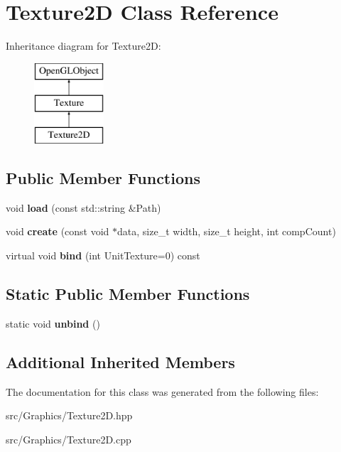\hypertarget{class_texture2_d}{\section{Texture2\+D Class Reference}
\label{class_texture2_d}
}
Inheritance diagram for Texture2\+D\+:\begin{figure}[H]
\begin{center}
\leavevmode
\includegraphics[height=3.000000cm]{class_texture2_d}
\end{center}
\end{figure}
\subsection*{Public Member Functions}
\begin{DoxyCompactItemize}
\item 
\hypertarget{class_texture2_d_a2f34b32ade581a7c2c51d33f073b7d6e}{void {\bfseries load} (const std\+::string \&Path)}\label{class_texture2_d_a2f34b32ade581a7c2c51d33f073b7d6e}

\item 
\hypertarget{class_texture2_d_abb1f4151f215b0c6b320d4655012f43b}{void {\bfseries create} (const void $\ast$data, size\+\_\+t width, size\+\_\+t height, int comp\+Count)}\label{class_texture2_d_abb1f4151f215b0c6b320d4655012f43b}

\item 
\hypertarget{class_texture2_d_a02b088645b5b17bfad6dadc62522df41}{virtual void {\bfseries bind} (int Unit\+Texture=0) const }\label{class_texture2_d_a02b088645b5b17bfad6dadc62522df41}

\end{DoxyCompactItemize}
\subsection*{Static Public Member Functions}
\begin{DoxyCompactItemize}
\item 
\hypertarget{class_texture2_d_ac21f1e200e9aa03d7371614e3026b079}{static void {\bfseries unbind} ()}\label{class_texture2_d_ac21f1e200e9aa03d7371614e3026b079}

\end{DoxyCompactItemize}
\subsection*{Additional Inherited Members}


The documentation for this class was generated from the following files\+:\begin{DoxyCompactItemize}
\item 
src/\+Graphics/Texture2\+D.\+hpp\item 
src/\+Graphics/Texture2\+D.\+cpp\end{DoxyCompactItemize}
